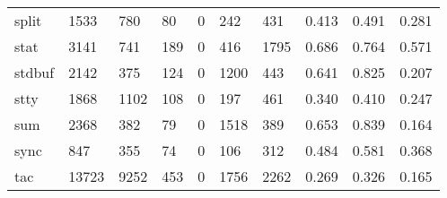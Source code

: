 \begin{longtable}{lp{1.3cm}p{1.3cm}p{1.3cm}p{1.3cm}p{1.3cm}p{1.3cm}p{1.3cm}p{1.3cm}p{1.3cm}}
split     &                   1533 &                                780 &                                80 &                                0 &                               242 &                             431 &                                   0.413 &                                  0.491 &                                0.281 \\
stat      &                   3141 &                                741 &                               189 &                                0 &                               416 &                            1795 &                                   0.686 &                                  0.764 &                                0.571 \\
stdbuf    &                   2142 &                                375 &                               124 &                                0 &                              1200 &                             443 &                                   0.641 &                                  0.825 &                                0.207 \\
stty      &                   1868 &                               1102 &                               108 &                                0 &                               197 &                             461 &                                   0.340 &                                  0.410 &                                0.247 \\
sum       &                   2368 &                                382 &                                79 &                                0 &                              1518 &                             389 &                                   0.653 &                                  0.839 &                                0.164 \\
sync      &                    847 &                                355 &                                74 &                                0 &                               106 &                             312 &                                   0.484 &                                  0.581 &                                0.368 \\
tac       &                  13723 &                               9252 &                               453 &                                0 &                              1756 &                            2262 &                                   0.269 &                                  0.326 &                                0.165 \\

\end{longtable}

